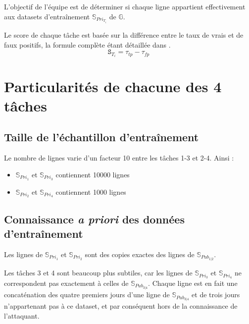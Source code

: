             L'objectif de l'équipe est de déterminer si chaque ligne appartient effectivement
aux datasets d'entraînement $\mathbb{S}_{Pri_{T_i}}$ de $\mathbb G$.

            Le score de chaque tâche est basée sur la différence entre le taux de vrais et de faux positifs, la formule complète étant détaillée dans \cite{snake_strikes_back}.
            \begin{equation}\label{Eq:scoring}
                \mathtt S_{T_i} = \tau_{tp} - \tau_{fp}
            \end{equation}
    \newpage\section{Particularités de chacune des 4 tâches}
        \subsection{Taille de l'échantillon d'entraînement}
            Le nombre de lignes varie d'un facteur 10 entre les tâches 1-3 et 2-4. Ainsi :
            \begin{itemize}
                \item $\mathbb{S}_{Pri_1}$ et $\mathbb{S}_{Pri_3}$ contiennent 10000 lignes
                \item $\mathbb{S}_{Pri_2}$ et $\mathbb{S}_{Pri_4}$ contiennent 1000 lignes
            \end{itemize}
        \subsection{Connaissance \textit{a priori} des données d'entraînement}
            Les lignes de $\mathbb{S}_{Pri_1}$ et $\mathbb{S}_{Pri_2}$ sont des copies exactes des lignes de $\mathbb{S}_{Pub_{1 | 2}}$.

            Les tâches 3 et 4 sont beaucoup plus subtiles, car les lignes de $\mathbb{S}_{Pri_3}$ et $\mathbb{S}_{Pri_4}$ ne correspondent pas exactement à celles de $\mathbb{S}_{Pub_{3 | 4}}$. Chaque ligne est en fait une concaténation des quatre premiers jours d'une ligne de $\mathbb{S}_{Pub_{3 | 4}}$ et de trois jours n'appartenant pas à ce dataset, et par conséquent hors de la connaissance de l'attaquant.


